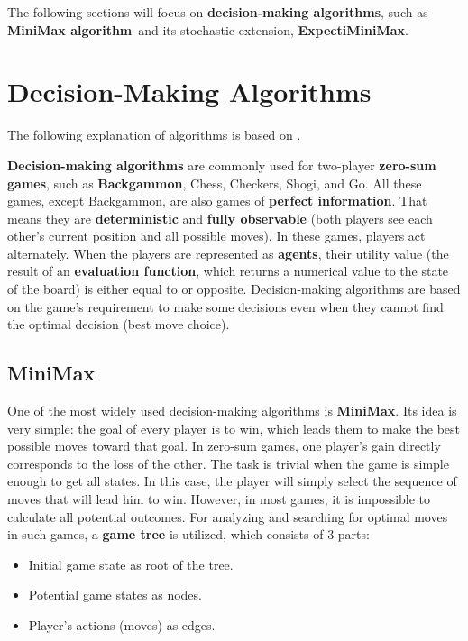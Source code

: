 The following sections will focus on \textbf{decision-making algorithms}, such as \textbf{MiniMax algorithm}~and its stochastic extension, \textbf{ExpectiMiniMax}.

\section{Decision-Making Algorithms}
The following explanation of algorithms is based on \cite[pp.~161--180]{russel2010}.

\textbf{Decision-making algorithms} are commonly used for two-player \textbf{zero-sum games}, such as \textbf{Backgammon}, Chess, Checkers, Shogi, and Go. All these games, except Backgammon, are also games of \textbf{perfect information}. That means they are \textbf{deterministic} and \textbf{fully observable} (both players see each other's current position and all possible moves). In these games, players act alternately. When the players are represented as \textbf{agents}, their utility value (the result of an \textbf{evaluation function}, which returns a numerical value to the state of the board) is either equal to or opposite. Decision-making algorithms are based on the game's requirement to make some decisions even when they cannot find the optimal decision (best move choice). 

\subsection{MiniMax}
One of the most widely used decision-making algorithms is \textbf{MiniMax}. Its idea is very simple: the goal of every player is to win, which leads them to make the best possible moves toward that goal. In zero-sum games, one player's gain directly corresponds to the loss of the other. The task is trivial when the game is simple enough to get all states. In this case, the player will simply select the sequence of moves that will lead him to win. However, in most games, it is impossible to calculate all potential outcomes. For analyzing and searching for optimal moves in such games, a \textbf{game tree} is utilized, which consists of 3 parts:
\begin{itemize}
    \item Initial game state as root of the tree.
    \item Potential game states as nodes.
    \item Player's actions (moves) as edges.
\end{itemize}

